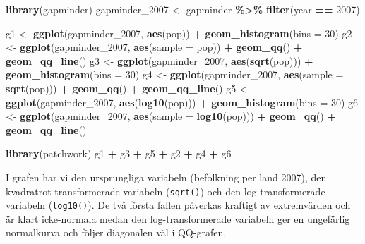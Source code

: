\documentclass[
]{book}
\newenvironment{Shaded}{\begin{snugshade}}{\end{snugshade}}
\newcommand{\AttributeTok}[1]{\textcolor[rgb]{0.13,0.29,0.53}{#1}}
\newcommand{\DecValTok}[1]{\textcolor[rgb]{0.00,0.00,0.81}{#1}}
\newcommand{\FunctionTok}[1]{\textcolor[rgb]{0.13,0.29,0.53}{\textbf{#1}}}
\newcommand{\NormalTok}[1]{#1}
\newcommand{\OtherTok}[1]{\textcolor[rgb]{0.56,0.35,0.01}{#1}}
\newcommand{\SpecialCharTok}[1]{\textcolor[rgb]{0.81,0.36,0.00}{\textbf{#1}}}
\theoremstyle{definition}
\theoremstyle{definition}
\theoremstyle{definition}
\theoremstyle{definition}
\theoremstyle{remark}
\begin{document}
\begin{Shaded}
\begin{Highlighting}[]
\FunctionTok{library}\NormalTok{(gapminder)}
\NormalTok{gapminder\_2007 }\OtherTok{\textless{}{-}}\NormalTok{ gapminder }\SpecialCharTok{\%\textgreater{}\%} \FunctionTok{filter}\NormalTok{(year }\SpecialCharTok{==} \DecValTok{2007}\NormalTok{)}

\NormalTok{g1 }\OtherTok{\textless{}{-}} \FunctionTok{ggplot}\NormalTok{(gapminder\_2007, }\FunctionTok{aes}\NormalTok{(pop)) }\SpecialCharTok{+} 
  \FunctionTok{geom\_histogram}\NormalTok{(}\AttributeTok{bins =} \DecValTok{30}\NormalTok{)}
\NormalTok{g2 }\OtherTok{\textless{}{-}} \FunctionTok{ggplot}\NormalTok{(gapminder\_2007, }\FunctionTok{aes}\NormalTok{(}\AttributeTok{sample =}\NormalTok{ pop)) }\SpecialCharTok{+} 
  \FunctionTok{geom\_qq}\NormalTok{() }\SpecialCharTok{+} 
  \FunctionTok{geom\_qq\_line}\NormalTok{()}
\NormalTok{g3 }\OtherTok{\textless{}{-}} \FunctionTok{ggplot}\NormalTok{(gapminder\_2007, }\FunctionTok{aes}\NormalTok{(}\FunctionTok{sqrt}\NormalTok{(pop))) }\SpecialCharTok{+} 
  \FunctionTok{geom\_histogram}\NormalTok{(}\AttributeTok{bins =} \DecValTok{30}\NormalTok{)}
\NormalTok{g4 }\OtherTok{\textless{}{-}} \FunctionTok{ggplot}\NormalTok{(gapminder\_2007, }\FunctionTok{aes}\NormalTok{(}\AttributeTok{sample =} \FunctionTok{sqrt}\NormalTok{(pop))) }\SpecialCharTok{+} 
  \FunctionTok{geom\_qq}\NormalTok{() }\SpecialCharTok{+} 
  \FunctionTok{geom\_qq\_line}\NormalTok{()}
\NormalTok{g5 }\OtherTok{\textless{}{-}} \FunctionTok{ggplot}\NormalTok{(gapminder\_2007, }\FunctionTok{aes}\NormalTok{(}\FunctionTok{log10}\NormalTok{(pop))) }\SpecialCharTok{+} 
  \FunctionTok{geom\_histogram}\NormalTok{(}\AttributeTok{bins =} \DecValTok{30}\NormalTok{)}
\NormalTok{g6 }\OtherTok{\textless{}{-}} \FunctionTok{ggplot}\NormalTok{(gapminder\_2007, }\FunctionTok{aes}\NormalTok{(}\AttributeTok{sample =} \FunctionTok{log10}\NormalTok{(pop))) }\SpecialCharTok{+} 
  \FunctionTok{geom\_qq}\NormalTok{() }\SpecialCharTok{+} 
  \FunctionTok{geom\_qq\_line}\NormalTok{()}

\FunctionTok{library}\NormalTok{(patchwork)}
\NormalTok{g1 }\SpecialCharTok{+}\NormalTok{ g3 }\SpecialCharTok{+}\NormalTok{ g5 }\SpecialCharTok{+}\NormalTok{ g2 }\SpecialCharTok{+}\NormalTok{ g4 }\SpecialCharTok{+}\NormalTok{ g6}
\end{Highlighting}
\end{Shaded}

I grafen har vi den ursprungliga variabeln (befolkning per land 2007), den kvadratrot-transformerade variabeln (\texttt{sqrt()}) och den log-transformerade variabeln (\texttt{log10()}). De två första fallen påverkas kraftigt av extremvärden och är klart icke-normala medan den log-transformerade variabeln ger en ungefärlig normalkurva och följer diagonalen väl i QQ-grafen.
\end{document}
